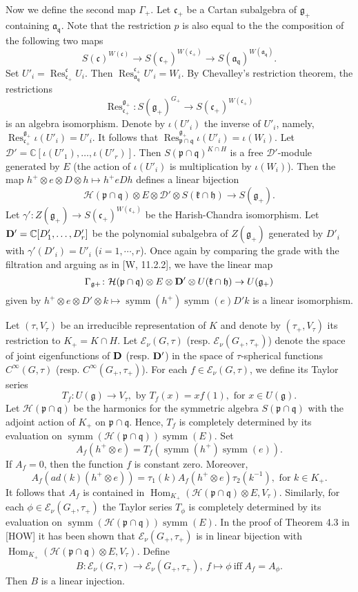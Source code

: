 \documentclass[a4paper]{amsart}
\theoremstyle{plain}
\theoremstyle{definition}
\def\Hom{\operatorname{Hom}}
\def\symm{\operatorname{symm}}
\def\Res{\operatorname{Res}}
\newcommand{\fra}{\mathfrak{a}}
\newcommand{\frc}{\mathfrak{c}}
\newcommand{\frg}{\mathfrak{g}}
\newcommand{\frh}{\mathfrak{h}}
\newcommand{\frk}{\mathfrak{k}}
\newcommand{\frp}{\mathfrak{p}}
\newcommand{\frq}{\mathfrak{q}}
\newcommand{\bbC}{\mathbb{C}}
\newcommand{\caD}{\mathcal{D}}
\newcommand{\caE}{\mathcal{E}}
\newcommand{\caH}{\mathcal{H}}
\begin{document}
Now we define the second map $\Gamma_+$. Let $\frc_+$ be a Cartan subalgebra of $\frg_+$ containing $\fra_\frq$.
Note that the restriction $p$ is also equal to the
the composition of the following two maps
$$S(\frc)^{W(\frc)}\rightarrow S(\frc_+)^{W(\frc_+)}\rightarrow S(\fra_{\frq})^{W(\fra_\frq)}.$$
Set $U'_i=\Res^{\frc}_{\frc_+} U_i$.  Then $\Res^{\frc_+}_{\fra_\frq}U'_i=W_i$.
By Chevalley's restriction theorem, the restrictions
$$\Res^{\frg_+}_{\frc_+}\colon S(\frg_+)^{G_+}\rightarrow S(\frc_+)^{W(\frc_+)} $$ is
an algebra isomorphism.  Denote by $\iota(U'_i)$ the inverse of $U'_i$, namely,
$\Res^{\frg_+}_{\frc_+} \iota(U'_i)=U'_i$.
It follows that $\Res^{\frg_+}_{\frp\cap\frq}\iota(U'_i)=\iota(W_i)$.
Let $\caD'=\bbC[\iota(U'_1),\ldots ,\iota(U'_r)]$.
Then $S(\frp\cap\frq)^{K\cap H}$ is a free $\caD'$-module generated by $E$ (the
action of $\iota(U'_i)$ is multiplication by $\iota(W_i)$).
Then the map $h^+\otimes e \otimes D \otimes h\mapsto h^+eDh$ defines a linear bijection
$$\caH(\frp\cap\frq)\otimes E\otimes {\caD'}\otimes S(\frk\cap \frh)\rightarrow S(\frg_+).$$
Let $\gamma'\colon Z(\frg_+)\rightarrow S(\frc_+)^{W(\frc_+)}$ be the
Harish-Chandra isomorphism.
Let ${\bf D'}=\bbC[D'_1,\ldots ,D'_r]$ be the polynomial subalgebra of $Z(\frg_+)$ generated by
$D'_i$ with $\gamma'(D'_i)=U'_i$   ($i=1,\cdots, r$).
Once again by comparing the grade with the filtration and arguing as in [W, 11.2.2], we
have the linear map
$$\Gamma_{\frg+}\colon \caH(\frp\cap\frq)\otimes E\otimes {\bf D'}\otimes U(\frk\cap\frh) \rightarrow U(\frg_+)$$
given by $ h^+\otimes e \otimes D' \otimes k\mapsto \symm(h^+)\symm(e)D'k$ is a linear isomorphism.




Let $(\tau,V_\tau)$ be an irreducible representation of $K$ and denote by $(\tau_+,V_\tau)$ its
restriction to $K_+=K\cap H$.
Let $\caE_\nu(G,\tau)$ (resp. $\caE_\nu(G_+,\tau_+)$) denote the space of
joint eigenfunctions of  $\bf D$ (resp. $\bf D'$) in the space of $\tau$-spherical functions $C^\infty(G,\tau)$
(resp. $C^\infty(G_+,\tau_+)$).
For each $f\in \caE_\nu(G,\tau)$, we define its Taylor series
$$T_f: U(\frg)\rightarrow V_\tau,  \text{ by }T_f(x)=xf(1), \text{ for }x\in U(\frg).$$
Let $\caH(\frp\cap \frq)$ be the harmonics for the symmetric algebra
$S(\frp\cap \frq)$ with the adjoint action of $K_+$ on $\frp\cap\frq$.
Hence, $T_f$ is completely determined by its evaluation on $\symm(\caH(\frp\cap\frq))\symm(E)$.
Set $$A_f(h^+\otimes e)=T_f(\symm(h^+)\symm(e)).$$
If $A_f=0$, then the function $f$ is constant zero.   Moreover,
$$A_f(ad(k)(h^+\otimes e))=
\tau_1(k)A_f(h^+\otimes e)\tau_2(k^{-1}), \text{ for }k\in K_+.$$  It follows that $A_f$ is contained in
$\Hom_{K_+}(\caH(\frp\cap\frq)\otimes E, V_\tau)$.
Similarly, for each $\phi\in \caE_\nu(G_+,\tau_+)$  the Taylor series $T_\phi$ is completely determined by its evaluation on $\symm(\caH(\frp\cap\frq))\symm(E)$.  In the proof of Theorem 4.3 in [HOW] it has been shown
that $\caE_\nu(G_+,\tau_+)$ is in linear bijection with $\Hom_{K_+}(\caH(\frp\cap\frq)\otimes E, V_\tau)$.
Define
$$B\colon \caE_\nu(G,\tau)\rightarrow \caE_\nu(G_+,\tau_+), \ f\mapsto \phi \ \text{iff}\ A_f=A_\phi.$$
Then $B$ is a linear injection.
\end{document}
